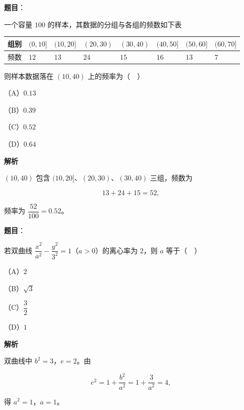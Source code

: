 \begin{answer}

\textbf{题目}：

一个容量 $100$ 的样本，其数据的分组与各组的频数如下表

\begin{center}
\begingroup\setlength{\tabcolsep}{4pt}
\begin{tabular}{llllllll}
\toprule
组别 & $(0,10]$ & $(10,20]$ & $(20,30)$ & $(30,40)$ & $(40,50]$ & $(50,60]$ & $(60,70]$ \\
\midrule
频数 & $12$ & $13$ & $24$ & $15$ & $16$ & $13$ & $7$ \\
\bottomrule
\end{tabular}
\endgroup
\end{center}

则样本数据落在 $(10,40)$ 上的频率为（　）

（A）$0.13$

（B）$0.39$

（C）$0.52$

（D）$0.64$

\textbf{解析}

$(10,40)$ 包含 $(10,20]$、$(20,30)$、$(30,40)$ 三组，频数为

\nopagebreak[4]
\[13+24+15=52,\]

频率为 $\dfrac{52}{100}=0.52$。


\end{answer}
\begin{answer}

\textbf{题目}：

若双曲线 $\dfrac{x^2}{a^2}-\dfrac{y^2}{3^2}=1$（$a>0$）的离心率为 $2$，则 $a$ 等于（　）

（A）$2$

（B）$\sqrt3$

（C）$\dfrac32$

（D）$1$

\textbf{解析}

双曲线中 $b^2=3$，$e=2$。由

\nopagebreak[4]
\[e^2=1+\frac{b^2}{a^2}=1+\frac3{a^2}=4,\]

得 $a^2=1$，$a=1$。


\end{answer}
